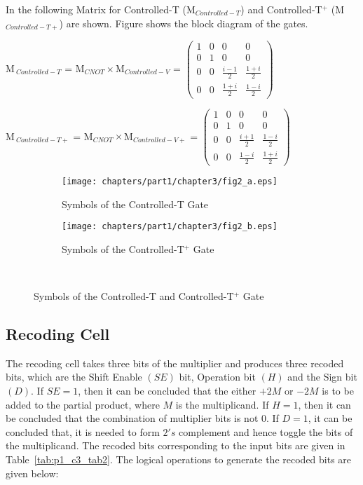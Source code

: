 In the following Matrix for Controlled-T (M${}_{Controlled-T}$) and Controlled-T${}^{+}$ (M${}_{Controlled-T+}$) are shown. Figure shows the block diagram of the gates.

\begin{center}\label{p1_c3_matrix_1}
	M${}_{\ Controlled-T}$ = M${}_{CNOT}\times$M${}_{Controlled-V}$ =   $\left( \begin{array}{cccc}
	1 & 0 & 0 & 0 \\ 
	0 & 1 & 0 & 0 \\ 
	0 & 0 & \frac{i-1}{2} & \frac{1+i}{2} \\ 
	0 & 0 & \frac{1+i}{2} & \frac{1-i}{2} \end{array}
	\right)$
	
	\noindent M${}_{\ Controlled-T+}$ = M${}_{CNOT}\times$M${}_{Controlled-V+}$ =  $\left( \begin{array}{cccc}
	1 & 0 & 0 & 0 \\ 
	0 & 1 & 0 & 0 \\ 
	0 & 0 & \frac{i+1}{2} & \frac{1-i}{2} \\ 
	0 & 0 & \frac{1-i}{2} & \frac{1+i}{2} \end{array}
	\right)$
\end{center}

\begin{figure}[h]
	\centering
	\begin{subfigure}[b]{0.30\textwidth}
		\centering
		\texttt{[image: chapters/part1/chapter3/fig2\_a.eps]}
		\caption{Symbols of the Controlled-T Gate}
		\label{fig:p1_c3_fig2_a}
	\end{subfigure}
	\begin{subfigure}[b]{0.30\textwidth}
		\centering
		\texttt{[image: chapters/part1/chapter3/fig2\_b.eps]}
		\caption{Symbols of the Controlled-T${}^{+}$ Gate}
		\label{fig:p2_c3_fig2_b}
	\end{subfigure}
	\
	\caption{Symbols of the Controlled-T and Controlled-T${}^{+}$ Gate}
	\label{fig:p1_c3_fig2}
\end{figure}
\subsection{Recoding Cell}

The recoding cell takes three bits of the multiplier and produces three recoded bits, which are the Shift Enable $(SE)$ bit, Operation bit $(H)$ and the Sign bit $(D)$. If $SE = 1$, then it can be concluded that the either $+2M$ or $-2M$ is to be added to the partial product, where $M$ is the multiplicand. If $H = 1$, then it can be concluded that the combination of multiplier bits is not $0$. If $D = 1$, it can be concluded that, it is needed to form $2's$ complement and hence toggle the bits of the multiplicand. The recoded bits corresponding to the input bits are given in Table~\ref{tab:p1_c3_tab2}. The logical operations to generate the recoded bits are given below:   

